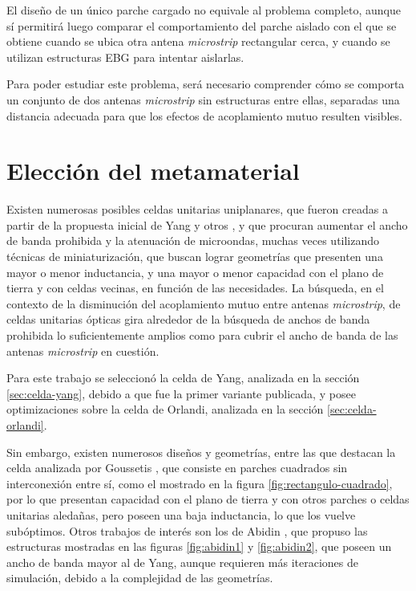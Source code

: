 
El diseño de un único parche cargado no equivale al problema completo, aunque sí permitirá luego comparar el comportamiento del parche aislado con el que se obtiene cuando se ubica otra antena \textit{microstrip} rectangular cerca, y cuando se utilizan estructuras EBG para intentar aislarlas.

Para poder estudiar este problema, será necesario comprender cómo se comporta un conjunto de dos antenas \textit{microstrip} sin estructuras entre ellas, separadas una distancia adecuada para que los efectos de acoplamiento mutuo resulten visibles.




\section{Elección del metamaterial}
\label{sec_eleccion}

Existen numerosas posibles celdas unitarias uniplanares, que fueron creadas a partir de la propuesta inicial de Yang y otros \cite{Yang:UCPBG}, y que procuran aumentar el ancho de banda prohibida y la atenuación de microondas, muchas veces utilizando técnicas de miniaturización, que buscan lograr geometrías que presenten una mayor o menor inductancia, y una mayor o menor capacidad con el plano de tierra y con celdas vecinas, en función de las necesidades. La búsqueda, en el contexto de la disminución del acoplamiento mutuo entre antenas \textit{microstrip}, de celdas unitarias ópticas gira alrededor de la búsqueda de anchos de banda prohibida lo suficientemente amplios como para cubrir el ancho de banda de las antenas \textit{microstrip} en cuestión.

Para este trabajo se seleccionó la celda de Yang, analizada en la sección \ref{sec:celda-yang}, debido a que fue la primer variante publicada, y posee optimizaciones sobre la celda de Orlandi, analizada en la sección \ref{sec:celda-orlandi}.

Sin embargo, existen numerosos diseños y geometrías, entre las que destacan la celda analizada por Goussetis \cite{Goussetis:TailoringAMCEBGCharacteristics}, que consiste en parches cuadrados sin interconexión entre sí, como el mostrado en la figura \ref{fig:rectangulo-cuadrado}, por lo que presentan capacidad con el plano de tierra y con otros parches o celdas unitarias aledañas, pero poseen una baja inductancia, lo que los vuelve subóptimos. Otros trabajos de interés son los de Abidin \cite{Abidin:Thesis}, que propuso las estructuras mostradas en las figuras \ref{fig:abidin1} y \ref{fig:abidin2}, que poseen un ancho de banda mayor al de Yang, aunque requieren más iteraciones de simulación, debido a la complejidad de las geometrías.

